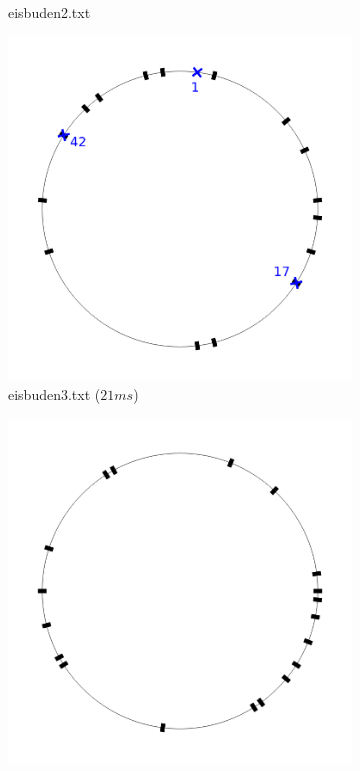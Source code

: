 \documentclass[a4paper,10pt,ngerman,captions=figureheading]{scrartcl}
\newcommand{\imageWidth}{0.3\linewidth}
\begin{document}
\begin{figure}[ht]
\begin{subfigure}[t]{\imageWidth}
        \caption{eisbuden2.txt}
        \label{fig:eisbuden2}
    \end{subfigure}
    \begin{subfigure}[t]{\imageWidth}
        \includegraphics[width=\linewidth]{eisbuden3.png}
        \caption{eisbuden3.txt ($21ms$)}
        \label{fig:eisbuden3}
    \end{subfigure}
    \begin{subfigure}[t]{\imageWidth}
        \includegraphics[width=\linewidth]{eisbuden4.png}

\end{subfigure}
\end{figure}
\end{document}
